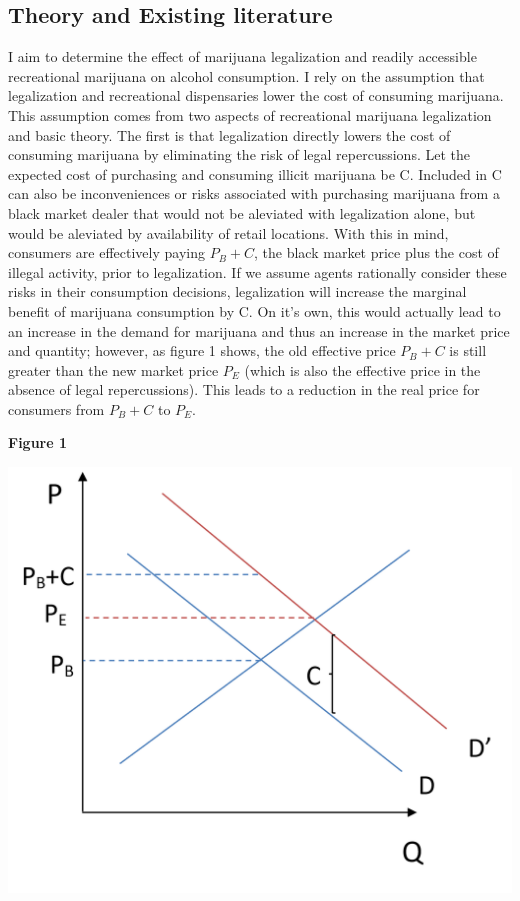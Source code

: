 \documentclass[11pt]{article}
\begin{document}
\subsection{Theory and Existing literature}

I aim to determine the effect of marijuana legalization and readily accessible recreational marijuana on alcohol consumption. I rely on the assumption that legalization and recreational dispensaries lower the cost of consuming marijuana. This assumption comes from two aspects of recreational marijuana legalization and basic theory. The first is that legalization directly lowers the cost of consuming marijuana by eliminating the risk of legal repercussions. Let the expected cost of purchasing and consuming illicit marijuana be C. Included in C can also be inconveniences or risks associated with purchasing marijuana from a black market dealer that would not be aleviated with legalization alone, but would be aleviated by availability of retail locations. With this in mind, consumers are effectively paying $P_B + C$, the black market price plus the cost of illegal activity, prior to legalization. If we assume agents rationally consider these risks in their consumption decisions, legalization will increase the marginal benefit of marijuana consumption by C. On it's own, this would actually lead to an increase in the demand for marijuana and thus an increase in the market price and quantity; however, as figure 1 shows, the old effective price $ P_B + C$ is still greater than the new market price $P_E$ (which is also the effective price in the absence of legal repercussions). This leads to a reduction in the real price for consumers from $ P_B + C$ to $P_E$. \par

\begin{center}
		\centering
	
	\textbf{Figure 1}\par\medskip
	
	\includegraphics[width=.5\linewidth]{legal_dside.png}
	
\end{center}
\end{document}
